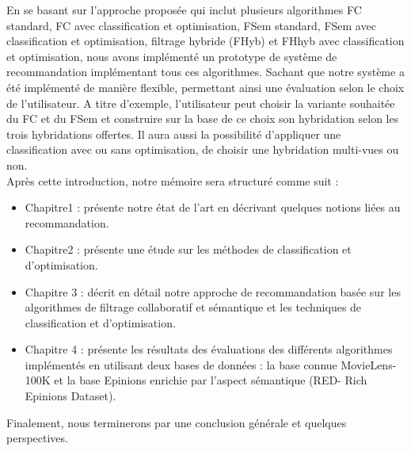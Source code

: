 En se basant sur l’approche proposée qui inclut plusieurs algorithmes FC standard, FC avec classification et optimisation, FSem standard, FSem avec classification et optimisation, filtrage hybride (FHyb) et FHhyb avec classification et optimisation, nous avons implémenté un prototype de système de recommandation implémentant tous ces algorithmes. Sachant que notre système a été implémenté de manière flexible, permettant ainsi une évaluation selon le choix de l’utilisateur. A titre d’exemple, l’utilisateur peut choisir la variante souhaitée du FC et du FSem et construire sur la base de ce choix son hybridation selon les trois hybridations offertes. Il aura aussi la possibilité d’appliquer une classification avec ou sans optimisation, de choisir une hybridation multi-vues ou non.\\

Après cette introduction, notre mémoire sera structuré comme suit :
\begin{itemize}
\item Chapitre1 : présente notre état de l’art en décrivant quelques notions liées au recommandation.
\item Chapitre2 : présente une étude sur les méthodes de classification et d’optimisation.
\item Chapitre 3 : décrit en détail notre approche de recommandation basée sur les algorithmes de filtrage collaboratif et sémantique et les techniques de classification et d’optimisation.
\item Chapitre 4 : présente les résultats  des évaluations  des différents algorithmes implémentés en utilisant deux bases de données : la base connue MovieLens-100K et la base Epinions enrichie par l’aspect sémantique (RED- Rich Epinions Dataset).

\end{itemize}
Finalement, nous terminerons par une conclusion générale et quelques perspectives.

